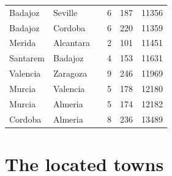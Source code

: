 \documentclass[11pt,a4paper]{article}
\begin{document}
{\begin{longtable}{p{4.2cm}p{4.2cm}rrrr}
Badajoz & Seville &  & 6 & 187 & 11356\\
Badajoz & Cordoba &  & 6 & 220 & 11359\\
Merida & Alcantara &  & 2 & 101 & 11451\\
Santarem & Badajoz &  & 4 & 153 & 11631\\
Valencia & Zaragoza &  & 9 & 246 & 11969\\
Murcia & Valencia &  & 5 & 178 & 12180\\
Murcia & Almeria &  & 5 & 174 & 12182\\
Cordoba & Almeria &  & 8 & 236 & 13489\\
\bottomrule\end{longtable}}

\section{The located towns}
\end{document}
